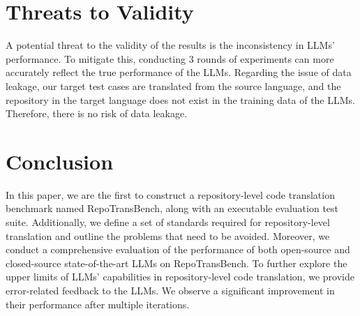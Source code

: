 \section{Threats to Validity}
A potential threat to the validity of the results is the inconsistency in LLMs' performance. To mitigate this, conducting 3 rounds of experiments can more accurately reflect the true performance of the LLMs. Regarding the issue of data leakage, our target test cases are translated from the source language, and the repository in the target language does not exist in the training data of the LLMs. Therefore, there is no risk of data leakage.

\section{Conclusion}
In this paper, we are the first to construct a repository-level code translation benchmark named RepoTransBench, along with an executable evaluation test suite. Additionally, we define a set of standards required for repository-level translation and outline the problems that need to be avoided. Moreover, we conduct a comprehensive evaluation of the performance of both open-source and closed-source state-of-the-art LLMs on RepoTransBench. To further explore the upper limits of LLMs' capabilities in repository-level code translation, we provide error-related feedback to the LLMs. We observe a significant improvement in their performance after multiple iterations.
